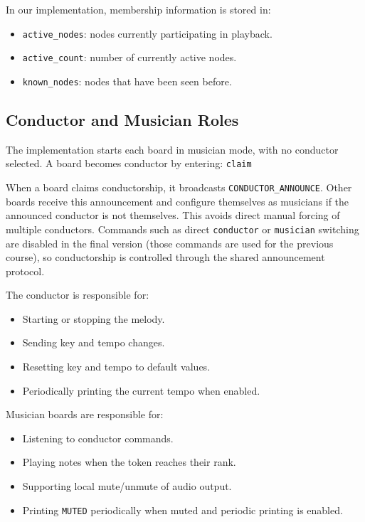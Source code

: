 \documentclass[11pt,a4paper]{article}
\begin{document}
In our implementation, membership information is stored in:

\begin{itemize}
  \item \texttt{active\_\allowbreak{}nodes}: nodes currently participating in playback.
  \item \texttt{active\_\allowbreak{}count}: number of currently active nodes.
  \item \texttt{known\_\allowbreak{}nodes}: nodes that have been seen before.
\end{itemize}

\subsection*{Conductor and Musician Roles}

The implementation starts each board in musician mode, with no conductor selected. A board becomes conductor by entering: \texttt{claim}

When a board claims conductorship, it broadcasts \texttt{CONDUCTOR\_\allowbreak{}ANNOUNCE}. Other boards receive this announcement and configure themselves as musicians if the announced conductor is not themselves. This avoids direct manual forcing of multiple conductors. Commands such as direct \texttt{conductor} or \texttt{musician} switching are disabled in the final version (those commands are used for the previous course), so conductorship is controlled through the shared announcement protocol.

The conductor is responsible for:

\begin{itemize}
  \item Starting or stopping the melody.
  \item Sending key and tempo changes.
  \item Resetting key and tempo to default values.
  \item Periodically printing the current tempo when enabled.
\end{itemize}

Musician boards are responsible for:

\begin{itemize}
  \item Listening to conductor commands.
  \item Playing notes when the token reaches their rank.
  \item Supporting local mute/unmute of audio output.
  \item Printing \texttt{MUTED} periodically when muted and periodic printing is enabled.
\end{itemize}
\end{document}
